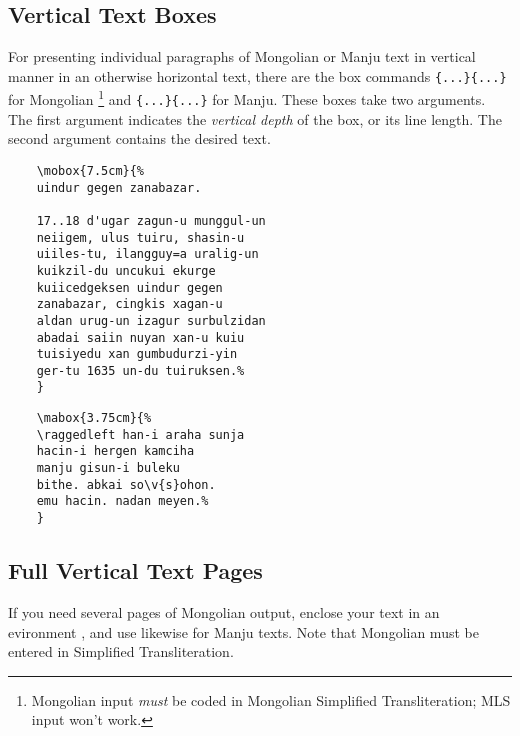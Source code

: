 \documentclass[11pt,a4paper]{article}
\begin{document}
\subsection{Vertical Text Boxes}

For presenting individual paragraphs of Mongolian or Manju text in
vertical manner in an otherwise horizontal text, there are the box
commands \verb|{...}{...}| for Mongolian%
\footnote{Mongolian input \emph{must} be coded in Mongolian Simplified
	Transliteration; MLS input won't work.}
and
\verb|{...}{...}|
for Manju. These boxes take two arguments. The first argument
indicates the \textit{vertical depth} of the box, or its line
length. The second argument contains the desired text.

\exa
\exb
	{\mdoublehyphenon
	\begin{verbatim}
	\mobox{7.5cm}{%
	uindur gegen zanabazar.

	17..18 d'ugar zagun-u munggul-un
	neiigem, ulus tuiru, shasin-u
	uiiles-tu, ilangguy=a uralig-un
	kuikzil-du uncukui ekurge
	kuiicedgeksen uindur gegen
	zanabazar, cingkis xagan-u
	aldan urug-un izagur surbulzidan
	abadai saiin nuyan xan-u kuiu
	tuisiyedu xan gumbudurzi-yin
	ger-tu 1635 un-du tuiruksen.%
	}
	\end{verbatim}}
\exc


\exa
\exb
	\begin{verbatim}
	\mabox{3.75cm}{%
	\raggedleft han-i araha sunja
	hacin-i hergen kamciha
	manju gisun-i buleku
	bithe. abkai so\v{s}ohon.
	emu hacin. nadan meyen.%
	}
	\end{verbatim}
\exc

\subsection{Full Vertical Text Pages\label{BicigandBithe}}

If you need several pages of Mongolian output, enclose your text
in an evironment , and use 
likewise for Manju texts. Note that Mongolian must be entered in
Simplified Transliteration.
\end{document}
